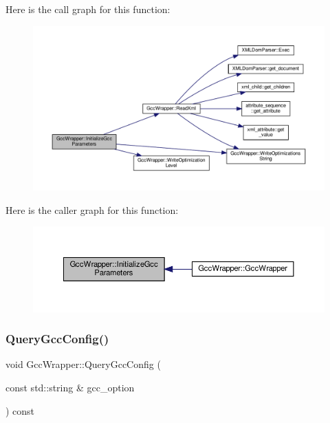 Here is the call graph for this function\+:
\nopagebreak
\begin{figure}[H]
\begin{center}
\leavevmode
\includegraphics[width=350pt]{d4/dbf/classGccWrapper_a4a76e5df0a374c835ce31580a2da8c7a_cgraph}
\end{center}
\end{figure}
Here is the caller graph for this function\+:
\nopagebreak
\begin{figure}[H]
\begin{center}
\leavevmode
\includegraphics[width=350pt]{d4/dbf/classGccWrapper_a4a76e5df0a374c835ce31580a2da8c7a_icgraph}
\end{center}
\end{figure}
\mbox{\label{classGccWrapper_a6ddadf157967ed22e87a5453f3bb25db}} 
\subsubsection{\texorpdfstring{Query\+Gcc\+Config()}{QueryGccConfig()}}
{\footnotesize\ttfamily void Gcc\+Wrapper\+::\+Query\+Gcc\+Config (\begin{DoxyParamCaption}\item[{const std\+::string \&}]{gcc\+\_\+option }\end{DoxyParamCaption}) const}



